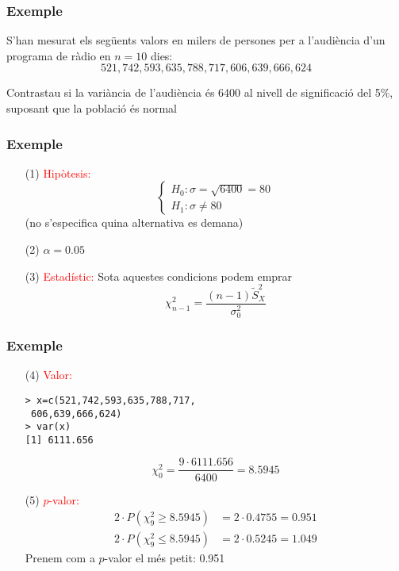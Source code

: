 \documentclass[12pt,t]{beamer}\usepackage[]{graphicx}\usepackage[]{color}
\newcommand{\red}[1]{\textcolor{red}{#1}}
\renewcommand{\leq}{\leqslant}
\renewcommand{\geq}{\geqslant}
\theoremstyle{plain}
\theoremstyle{definition}
\begin{document}
\begin{frame}
\frametitle{Exemple}

S'han mesurat els següents valors en milers de persones per a l'audiència
d'un programa de ràdio en $n=10$ dies:
$$
521, 742, 593, 635, 788, 717, 606, 639, 666, 624
$$

Contrastau si la variància de l'audiència és 6400 al nivell
de significació del 5\%, suposant que la població és normal

\end{frame}

\begin{frame}
\frametitle{Exemple}
\begin{itemize}
\item[(1)] \red{Hipòtesis:}
$$\left\{\begin{array}{l}
H_{0}:\sigma=\sqrt{6400}=80 \\
H_{1}:\sigma\neq 80
\end{array}
\right.$$
(no s'especifica quina alternativa es
demana)
\medskip


\item[(2)] $\alpha=0.05$

\item[(3)] \red{Estadístic:} Sota aquestes condicions podem emprar
$$
\chi_{n-1}^2=\frac{(n-1) \widetilde{S}_X^2}{\sigma_{0}^2}
$$
\end{itemize}
\end{frame}


\begin{frame}[fragile]
\frametitle{Exemple}
\begin{itemize}

\item[(4)] \red{Valor:}
\begin{verbatim}
> x=c(521,742,593,635,788,717,
 606,639,666,624)
> var(x)
[1] 6111.656
\end{verbatim}
$$
\chi_0^2=\frac{9\cdot 6111.656}{6400}=8.5945
$$







\item[(5)] \red{$p$-valor:}
$$
\begin{array}{rl}
2\cdot P(\chi_9^2\geq 8.5945)& =2\cdot 0.4755=0.951\\[1ex]
2\cdot P(\chi_9^2\leq 8.5945) &=2\cdot 0.5245=1.049
\end{array}
$$
Prenem com a $p$-valor el més petit: 0.951
\end{itemize}
\end{frame}
\end{document}
